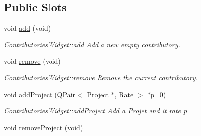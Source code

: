 \subsection*{Public Slots}
\begin{DoxyCompactItemize}
\item 
\hypertarget{classGui_1_1Widgets_1_1ContributoriesWidget_a756c0d1076fad1a3805975343e66a1de}{}void \hyperlink{classGui_1_1Widgets_1_1ContributoriesWidget_a756c0d1076fad1a3805975343e66a1de}{add} (void)\label{classGui_1_1Widgets_1_1ContributoriesWidget_a756c0d1076fad1a3805975343e66a1de}

\begin{DoxyCompactList}\small\item\em \hyperlink{classGui_1_1Widgets_1_1ContributoriesWidget_ae61498391d4aaf199bed8183961d515c}{Contributories\+Widget\+::add} Add a new empty contributory. \end{DoxyCompactList}\item 
\hypertarget{classGui_1_1Widgets_1_1ContributoriesWidget_a35895ad0b9c497263f633680288b414e}{}void \hyperlink{classGui_1_1Widgets_1_1ContributoriesWidget_a35895ad0b9c497263f633680288b414e}{remove} (void)\label{classGui_1_1Widgets_1_1ContributoriesWidget_a35895ad0b9c497263f633680288b414e}

\begin{DoxyCompactList}\small\item\em \hyperlink{classGui_1_1Widgets_1_1ContributoriesWidget_a35895ad0b9c497263f633680288b414e}{Contributories\+Widget\+::remove} Remove the current contributory. \end{DoxyCompactList}\item 
void \hyperlink{classGui_1_1Widgets_1_1ContributoriesWidget_afaa982bf1f4b77fd3bf55be0c83c4056}{add\+Project} (Q\+Pair$<$ \hyperlink{classModels_1_1Project}{Project} $\ast$, \hyperlink{classModels_1_1Rate}{Rate} $>$ $\ast$p=0)
\begin{DoxyCompactList}\small\item\em \hyperlink{classGui_1_1Widgets_1_1ContributoriesWidget_afaa982bf1f4b77fd3bf55be0c83c4056}{Contributories\+Widget\+::add\+Project} Add a Projet and it rate {\itshape p} \end{DoxyCompactList}\item 
\hypertarget{classGui_1_1Widgets_1_1ContributoriesWidget_ad907c5827c4e1ee3b82adbe6f2f77309}{}void \hyperlink{classGui_1_1Widgets_1_1ContributoriesWidget_ad907c5827c4e1ee3b82adbe6f2f77309}{remove\+Project} (void)\label{classGui_1_1Widgets_1_1ContributoriesWidget_ad907c5827c4e1ee3b82adbe6f2f77309}


\end{DoxyCompactItemize}
